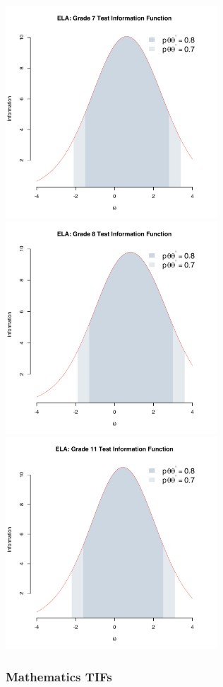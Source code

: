 \documentclass[]{article}
\begin{document}
\includegraphics[height=3.12500in]{tifs/ela7tif.pdf}
\includegraphics[height=3.12500in]{tifs/ela8tif.pdf}
\includegraphics[height=3.12500in]{tifs/ela11tif.pdf}

\subsubsection{Mathematics TIFs}\label{mathematics-tifs}
\end{document}
